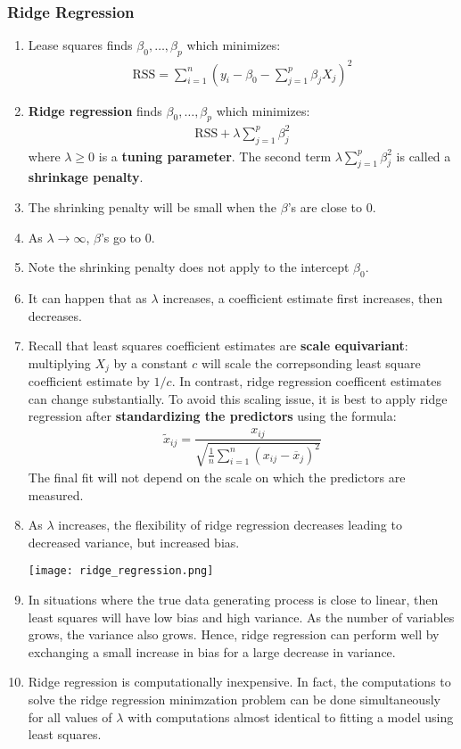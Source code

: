 \documentclass[10pt]{article}
\begin{document}
\subsubsection{Ridge Regression}
\begin{enumerate}
	\item Lease squares finds $\beta_0, \dots, \beta_p$ which minimizes:
	\begin{align*}
		\mathrm{RSS} = \sum_{i = 1}^n \left( y_i - \beta_0 - \sum_{j = 1}^p \beta_j X_j \right)^2 
	\end{align*}
	\item \textbf{Ridge regression} finds $\beta_0, \dots, \beta_p$ which minimizes: 
	\begin{align*}
		\mathrm{RSS} + \lambda \sum_{j = 1}^p \beta_j^2
	\end{align*}
	where $\lambda \geq 0$ is a \textbf{tuning parameter}.  The second term $\lambda \sum_{j = 1}^p \beta_j^2$ is called a \textbf{shrinkage penalty}.  
	\item The shrinking penalty will be small when the $\beta$'s are close to 0.
	\item As $\lambda \to \infty$, $\beta$'s go to 0. 
	\item Note the shrinking penalty does not apply to the intercept $\beta_0$. 
	\item It can happen that as $\lambda$ increases, a coefficient estimate first increases, then decreases.
	\item Recall that least squares coefficient estimates are \textbf{scale equivariant}: multiplying $X_j$ by a constant $c$ will scale the correpsonding least square coefficient estimate by $1/c$.  In contrast, ridge regression coefficent estimates can change substantially. To avoid this scaling issue, it is best to apply ridge regression after \textbf{standardizing the predictors} using the formula: 
	\begin{align*}
		\tilde{x}_{ij} = \dfrac{x_{ij}}{\sqrt{\frac{1}{n} \sum_{i = 1}^n (x_{ij} - \overline{x}_j)^2}}
	\end{align*}
	The final fit will not depend on the scale on which the predictors are measured.
	\item As $\lambda$ increases, the flexibility of ridge regression decreases leading to decreased variance, but increased bias.
	
	\texttt{[image: ridge\_regression.png]}
	\item In situations where the true data generating process is close to linear, then least squares will have low bias and high variance.  As the number of variables grows, the variance also grows.  Hence, ridge regression can perform well by exchanging a small increase in bias for a large decrease in variance.
	\item Ridge regression is computationally inexpensive.  In fact, the computations to solve the ridge regression minimzation problem can be done simultaneously for all values of $\lambda$ with computations almost identical to fitting a model using least squares.
\end{enumerate}
\end{document}
